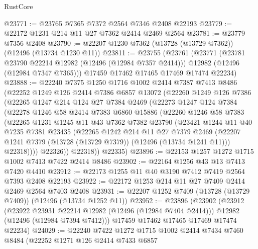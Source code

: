 \begin{lexlean}{RustCore}
\begin{coremodule}
@23771 := @23765 @7365 @7372 @2564 @7346 @2408 @22193
@23779 := @22172 @1231 @214 @11 @27 @7362 @2414 @2469 @2564
@23781 := @23779 @7356 @2408
@23790 := @22207 @1230 @7362 (@13728 (@13729 @7362)) (@12496 (@13734 @1230 @11))
@23811 := @23755
    (@23761
      (@23771
        (@23781 @23790 @22214 @12982 (@12496 (@12984 @7357 @2414)))
        @12982
        (@12496 (@12984 @7347 @7365)))
      @17459
      @17462
      @17465
      @17469
      @17474
      @22234)
@23888 := @22240
    @7375
    @1250
    @1716
    @1002
    @2414
    @7387
    @7413
    @8486
    (@22252
      @1249
      @126
      @2414
      @7386
      @6857
      @13072
      (@22260
        @1249
        @126
        @7386
        (@22265
          @1247
          @214
          @124
          @27
          @7384
          @2469
          (@22273
            @1247
            @124
            @7384
            (@22278
              @1246
              @58
              @2414
              @7383
              @6860
              @15886
              (@22260
                @1246
                @58
                @7383
                (@22265
                  @1231
                  @1245
                  @11
                  @43
                  @7362
                  @7382
                  @23790
                  (@23421
                    @1244
                    @11
                    @40
                    @7235
                    @7381
                    @23435
                    (@22265
                      @1242
                      @214
                      @11
                      @27
                      @7379
                      @2469
                      (@22207 @1241 @7379 (@13728 (@13729 @7379)) (@12496 (@13734 @1241 @11)))
                      @22318))))
              @22326))
          @22318))
      @22335)
@23896 := @22153 @1257 @1272 @1715 @1002 @7413 @7422 @2414 @8486
@23902 := @22164 @1256 @43 @13 @7413 @7420 @4410
@23912 := @22173 @1255 @11 @40 @3190 @7412 @7419 @2564 @7393 @2408 @22193
@23922 := @22172 @1253 @214 @11 @27 @7409 @2414 @2469 @2564 @7403 @2408
@23931 := @22207 @1252 @7409 (@13728 (@13729 @7409)) (@12496 (@13734 @1252 @11))
@23952 := @23896
    (@23902
      (@23912
        (@23922 @23931 @22214 @12982 (@12496 (@12984 @7404 @2414)))
        @12982
        (@12496 (@12984 @7394 @7412)))
      @17459
      @17462
      @17465
      @17469
      @17474
      @22234)
@24029 := @22240
    @7422
    @1272
    @1715
    @1002
    @2414
    @7434
    @7460
    @8484
    (@22252
      @1271
      @126
      @2414
      @7433
      @6857

\end{coremodule}
\end{lexlean}
